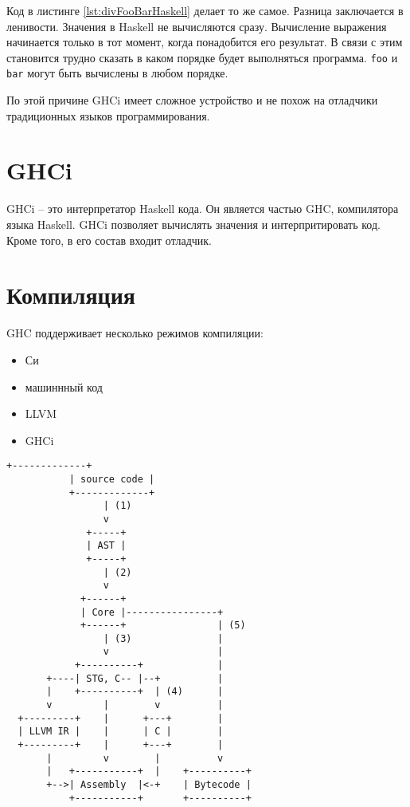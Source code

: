 \documentclass[14pt]{extarticle}
\def\code#1{\texttt{#1}}
\begin{document}
Код в листинге \ref{lst:divFooBarHaskell} делает то же самое. Разница
заключается в ленивости. Значения в Haskell не вычисляются сразу. Вычисление
выражения начинается только в тот момент, когда понадобится его результат. В
связи с этим становится трудно сказать в каком порядке будет выполняться
программа. \code{foo} и \code{bar} могут быть вычислены в любом порядке.

По этой причине GHCi имеет сложное устройство и не похож на отладчики
традиционных языков программирования.

\section{GHCi}

GHCi -- это интерпретатор Haskell кода. Он является частью GHC, компилятора
языка Haskell. GHCi позволяет вычислять значения и интерпритировать код. Кроме
того, в его состав входит отладчик.

\section{Компиляция}

GHC поддерживает несколько режимов компиляции:

\begin{itemize}
\item Си
\item машиннный код
\item LLVM 
\item GHCi
\end{itemize}

\begin{lstlisting}[float, floatplacement=H, label={lst:compilation},
caption=Схема процесса компиляции]
           +-------------+
           | source code |
           +-------------+
                 | (1)
                 v
              +-----+
              | AST |
              +-----+
                 | (2)
                 v
             +------+
             | Core |----------------+
             +------+                | (5)
                 | (3)               |
                 v                   |
            +----------+             |
       +----| STG, C-- |--+          |
       |    +----------+  | (4)      |
       v         |        v          |
  +---------+    |      +---+        |
  | LLVM IR |    |      | C |        |
  +---------+    |      +---+        |
       |         v        |          v
       |   +-----------+  |    +----------+
       +-->| Assembly  |<-+    | Bytecode |
           +-----------+       +----------+
\end{lstlisting}
\end{document}
